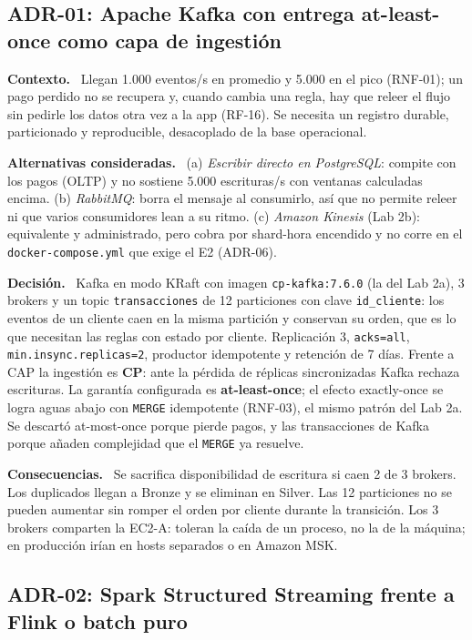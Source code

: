\documentclass[12pt,letterpaper]{article}
\newcommand{\code}[1]{{\small\texttt{#1}}}
\newcommand{\adrpart}[1]{\textbf{#1.}~}
\begin{document}
\subsection*{ADR-01: Apache Kafka con entrega at-least-once como capa de ingestión}

\adrpart{Contexto} Llegan 1.000 eventos/s en promedio y 5.000 en el pico (RNF-01); un pago perdido no se recupera y, cuando cambia una regla, hay que releer el flujo sin pedirle los datos otra vez a la app (RF-16). Se necesita un registro durable, particionado y reproducible, desacoplado de la base operacional.

\adrpart{Alternativas consideradas} (a) \emph{Escribir directo en PostgreSQL}: compite con los pagos (OLTP) y no sostiene 5.000 escrituras/s con ventanas calculadas encima. (b) \emph{RabbitMQ}: borra el mensaje al consumirlo, así que no permite releer ni que varios consumidores lean a su ritmo. (c) \emph{Amazon Kinesis} (Lab 2b): equivalente y administrado, pero cobra por shard-hora encendido y no corre en el \code{docker-compose.yml} que exige el E2 (ADR-06).

\adrpart{Decisión} Kafka en modo KRaft con imagen \code{cp-kafka:7.6.0} (la del Lab 2a), 3 brokers y un topic \code{transacciones} de 12 particiones con clave \code{id\_cliente}: los eventos de un cliente caen en la misma partición y conservan su orden, que es lo que necesitan las reglas con estado por cliente. Replicación 3, \code{acks=all}, \code{min.insync.replicas=2}, productor idempotente y retención de 7 días. Frente a CAP la ingestión es \textbf{CP}: ante la pérdida de réplicas sincronizadas Kafka rechaza escrituras. La garantía configurada es \textbf{at-least-once}; el efecto exactly-once se logra aguas abajo con \code{MERGE} idempotente (RNF-03), el mismo patrón del Lab 2a. Se descartó at-most-once porque pierde pagos, y las transacciones de Kafka porque añaden complejidad que el \code{MERGE} ya resuelve.

\adrpart{Consecuencias} Se sacrifica disponibilidad de escritura si caen 2 de 3 brokers. Los duplicados llegan a Bronze y se eliminan en Silver. Las 12 particiones no se pueden aumentar sin romper el orden por cliente durante la transición. Los 3 brokers comparten la EC2-A: toleran la caída de un proceso, no la de la máquina; en producción irían en hosts separados o en Amazon MSK.

\subsection*{ADR-02: Spark Structured Streaming frente a Flink o batch puro}
\end{document}
